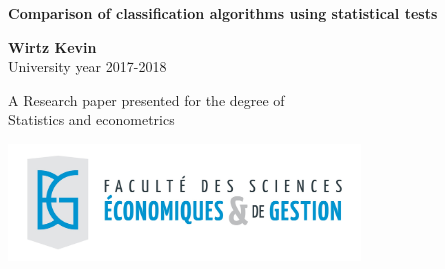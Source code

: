 \documentclass[a4paper,12pt]{article}
\numberwithin{equation}{section}
\begin{document}
\setcounter{page}{0} %

\begin{titlepage}
    \begin{center}


        \vspace*{4cm}
        
        
        {\Huge\textbf{Comparison of classification algorithms using statistical tests}}
        
        \vspace{0.5cm}
        
        \vspace{1.5cm}
        
        {\LARGE\textbf{Wirtz Kevin}}\\
        \vspace{\baselineskip}
        {\Large University year 2017-2018}
        \vfill
        
        {\Large A Research paper presented for the degree of}\\
        {\Large Statistics and econometrics} 
        
        \vspace{0.8cm}
        
        \includegraphics[width=0.7\textwidth]{LogoFSEG.png}
        
        
    \end{center}
\end{titlepage} 
\end{document}
